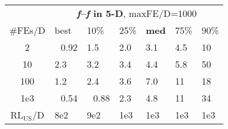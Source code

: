 \begin{tabular}{c|llllll}
 & \multicolumn{6}{|c}{\textbf{\textit{f}\raisebox{-0.35ex}{1}--\textit{f}\raisebox{-0.35ex}{24} in 5-D}, maxFE/D=1000}\\
\#FEs/D & best & 10\% & 25\% & \textbf{med} & 75\% & 90\%\\
2 & ~\,0.92 & \hspace*{1ex}1.5 & \hspace*{1ex}2.0 & \hspace*{1ex}3.1 & \hspace*{1ex}4.5 & 10\\
10 & \hspace*{1ex}2.3 & \hspace*{1ex}3.2 & \hspace*{1ex}3.4 & \hspace*{1ex}4.4 & \hspace*{1ex}5.8 & 50\\
100 & \hspace*{1ex}1.2 & \hspace*{1ex}2.4 & \hspace*{1ex}3.6 & \hspace*{1ex}7.0 & 11 & 18\\
1e3 & ~\,0.54 & ~\,0.88 & \hspace*{1ex}2.3 & \hspace*{1ex}4.8 & 11 & 34\\
$\text{RL}_{\text{US}}$/D & 8e2 & 9e2 & 1e3 & 1e3 & 1e3 & 1e3
\end{tabular}
